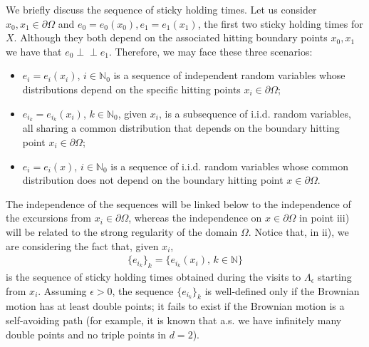 \documentclass[11pt,a4paper]{article}
\newcommand{\indep}{\perp \! \! \! \perp}
\begin{document}
{We briefly discuss the sequence of sticky holding times. Let us consider  $x_0,x_1 \in \partial \Omega$ and $e_0=e_0(x_0), e_1=e_1(x_1)$,  the first two sticky holding times for $X$. Although they both depend on the associated hitting boundary points $x_0,x_1$ we have that $e_0 \indep e_1$. Therefore, we may face these three scenarios: 
\begin{itemize}
\item[i)] $e_i=e_i(x_i)$, $i \in \mathbb{N}_0$ is a sequence of independent random variables whose distributions depend on the specific hitting points $x_i \in \partial \Omega$;
\item[ii)] $e_{i_k}=e_{i_k}(x_i)$, $k \in \mathbb{N}_0$, given $x_i$,  is a subsequence of i.i.d. random variables, all sharing a common distribution that depends on the boundary hitting point $x_i \in \partial \Omega$;
\item[iii)] $e_{i}=e_{i}(x)$, $i \in \mathbb{N}_0$ is a sequence of i.i.d. random variables whose common distribution does not depend on the boundary hitting point $x \in \partial \Omega$.
\label{propertiesSeqSHT}
\end{itemize}
The independence of the sequences will be linked below to the independence of the excursions from $x_i \in \partial \Omega$, whereas the independence on $x \in \partial \Omega$ in point iii) will be related to the strong regularity of the domain $\Omega$. Notice that, in ii),  we are considering the fact that, given $x_i$,
\begin{align*}
\{e_{i_k} \}_k = \{e_{i_k}(x_i),\, k \in \mathbb{N}\}
\end{align*}
is the sequence of sticky holding times obtained during the visits to $\Lambda_\epsilon$ starting from $x_i$. Assuming $\epsilon>0$, the sequence $\{e_{i_k} \}_k$ is well-defined only if the Brownian motion has at least double points; it fails to exist if the Brownian motion is a self-avoiding path (for example, it is known that a.s. we have infinitely many double points and no triple points in $d=2$).\\

}
\end{document}
